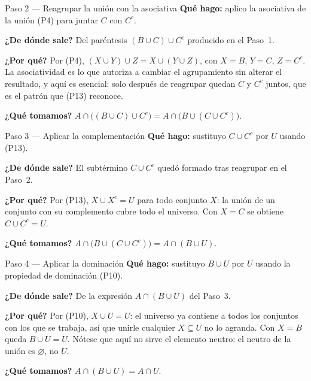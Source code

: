 \documentclass[11pt]{article}
\begin{document}
\begin{paso}{Paso 2 --- Reagrupar la unión con la asociativa}
\textbf{Qué hago:} aplico la asociativa de la unión (P4) para juntar $C$ con $C^{c}$.

\textbf{¿De dónde sale?} Del paréntesis $(B\cup C)\cup C^{c}$ producido en el Paso~1.

\textbf{¿Por qué?} Por (P4), $(X\cup Y)\cup Z=X\cup(Y\cup Z)$, con $X=B$, $Y=C$, $Z=C^{c}$. La
asociatividad es lo que autoriza a cambiar el agrupamiento sin alterar el resultado, y aquí es
esencial: solo después de reagrupar quedan $C$ y $C^{c}$ juntos, que es el patrón que (P13)
reconoce.

\textbf{¿Qué tomamos?} $A\cap\bigl((B\cup C)\cup C^{c}\bigr)=A\cap\bigl(B\cup(C\cup C^{c})\bigr)$.
\end{paso}

\begin{paso}{Paso 3 --- Aplicar la complementación}
\textbf{Qué hago:} sustituyo $C\cup C^{c}$ por $U$ usando (P13).

\textbf{¿De dónde sale?} El subtérmino $C\cup C^{c}$ quedó formado tras reagrupar en el Paso~2.

\textbf{¿Por qué?} Por (P13), $X\cup X^{c}=U$ para todo conjunto $X$: la unión de un conjunto
con su complemento cubre todo el universo. Con $X=C$ se obtiene $C\cup C^{c}=U$.

\textbf{¿Qué tomamos?} $A\cap\bigl(B\cup(C\cup C^{c})\bigr)=A\cap(B\cup U)$.
\end{paso}

\begin{paso}{Paso 4 --- Aplicar la dominación}
\textbf{Qué hago:} sustituyo $B\cup U$ por $U$ usando la propiedad de dominación (P10).

\textbf{¿De dónde sale?} De la expresión $A\cap(B\cup U)$ del Paso~3.

\textbf{¿Por qué?} Por (P10), $X\cup U=U$: el universo ya contiene a todos los conjuntos con los
que se trabaja, así que unirle cualquier $X\subseteq U$ no lo agranda. Con $X=B$ queda
$B\cup U=U$. Nótese que aquí no sirve el elemento neutro: el neutro de la unión es $\varnothing$,
no $U$.

\textbf{¿Qué tomamos?} $A\cap(B\cup U)=A\cap U$.
\end{paso}
\end{document}
